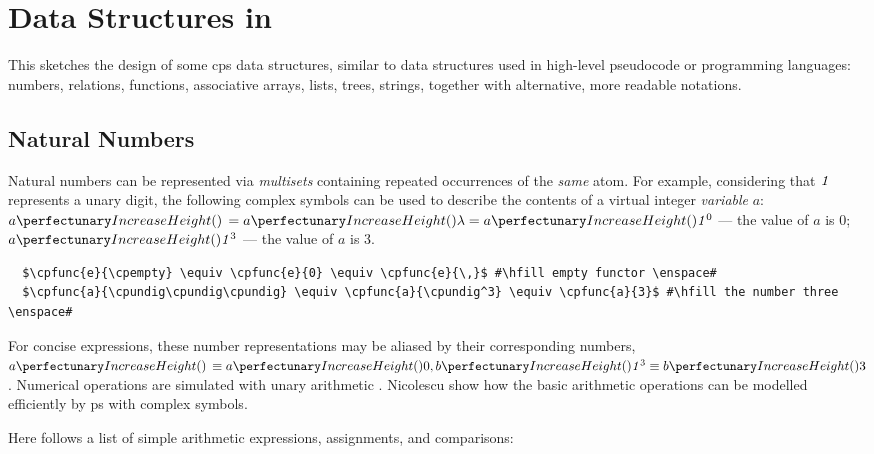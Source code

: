 \section{Data Structures in }\label{sec:cps:datastructures}

This  sketches the design of some \gls{cps} data structures, 
similar to data structures used in high-level pseudocode or programming languages:
numbers, relations, functions, associative arrays, lists, trees, strings, 
together with alternative, more readable notations.

\subsection{\label{sec:cps:natnums}Natural Numbers}
Natural numbers can be represented via \emph{multisets} containing repeated occurrences of the \emph{same} atom.
For example, considering that \(\mathit{1}\) represents a unary digit, 
the following complex symbols can be used to describe 
the contents of a virtual integer \emph{variable} \(a\): 
\(\cpfunc{a}{\,} = \cpfunc{a}{\cpempty} = \cpfunc{a}{\cpundig^0}\) --- the value of \(a\) is 0;
\(\cpfunc{a}{\cpundig^3}\) --- the value of \(a\) is 3.

\lstset{xleftmargin=.5in, xrightmargin=.5in} 
\begin{lstlisting}
  $\cpfunc{e}{\cpempty} \equiv \cpfunc{e}{0} \equiv \cpfunc{e}{\,}$ #\hfill empty functor \enspace#
  $\cpfunc{a}{\cpundig\cpundig\cpundig} \equiv \cpfunc{a}{\cpundig^3} \equiv \cpfunc{a}{3}$ #\hfill the number three \enspace#
\end{lstlisting}

For concise expressions, these number representations may be aliased by their corresponding numbers, \eg{}~\(\cpfunc{a}{\,} \equiv \cpfunc{a}{0}, \cpfunc{b}{\cpundig^3} \equiv \cpfunc{b}{3}\).  Numerical operations are simulated with unary arithmetic \cite{Aman2019,Bonchis2006}.
Nicolescu \etal{} \cite{Nicolescu2014,RN-HW-ROMJIST14} show how the basic arithmetic operations can be modelled efficiently by \gls{ps} with complex symbols.

Here follows a list of simple arithmetic expressions, assignments, and comparisons:

